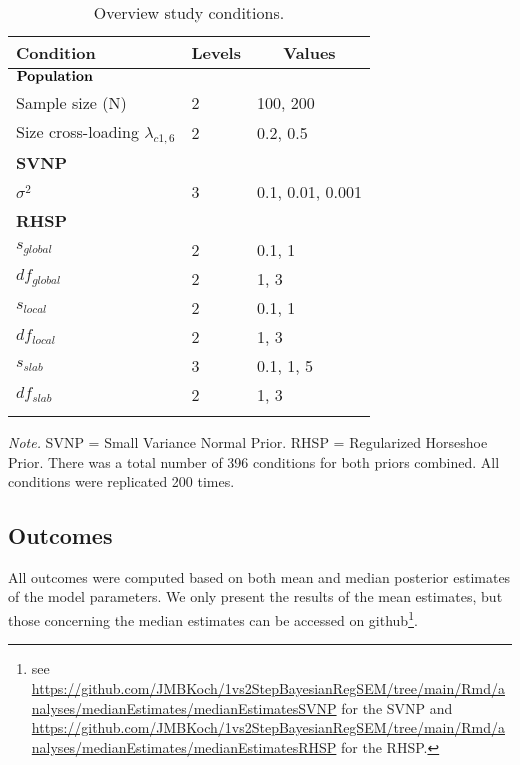 \documentclass[]{interact}
\theoremstyle{plain}%
\theoremstyle{definition}
\theoremstyle{remark}
\begin{document}
\begin{table}[tbp]

\begin{center}
\begin{threeparttable}

\caption{\label{tab:unnamed-chunk-2}Overview study conditions.}

\begin{tabular}{lll}
\toprule
Condition & \multicolumn{1}{c}{Levels} & \multicolumn{1}{c}{Values}\\
\midrule
$\bf{Population}$ &  & \\
Sample size (N) & 2 & 100, 200\\
Size cross-loading $\lambda_{c1 , 6}$ & 2 & 0.2, 0.5\\
\bf{SVNP} &  & \\
$\sigma^2$ & 3 & 0.1, 0.01, 0.001\\
\bf{RHSP} &  & \\
$s_{global}$ & 2 & 0.1, 1\\
$df_{global}$ & 2 & 1, 3\\
$s_{local}$ & 2 & 0.1, 1\\
$df_{local}$ & 2 & 1, 3\\
$s_{slab}$ & 3 & 0.1, 1, 5\\
$df_{slab}$ & 2 & 1, 3\\
\bottomrule
\addlinespace
\end{tabular}

\begin{tablenotes}[para]
\normalsize{\textit{Note.} SVNP = Small Variance Normal Prior. RHSP = Regularized Horseshoe Prior. There was a total number of 396 conditions for both priors combined.  All conditions were replicated 200 times.}
\end{tablenotes}

\end{threeparttable}
\end{center}

\end{table}

\hypertarget{outcomes}{%
\subsection{Outcomes}\label{outcomes}}

All outcomes were computed based on both mean and median posterior
estimates of the model parameters. We only present the results of the
mean estimates, but those concerning the median estimates can be
accessed on github\footnote{see
  \url{https://github.com/JMBKoch/1vs2StepBayesianRegSEM/tree/main/Rmd/analyses/medianEstimates/medianEstimatesSVNP}
  for the SVNP and
  \url{https://github.com/JMBKoch/1vs2StepBayesianRegSEM/tree/main/Rmd/analyses/medianEstimates/medianEstimatesRHSP}
  for the RHSP.}.
\end{document}

